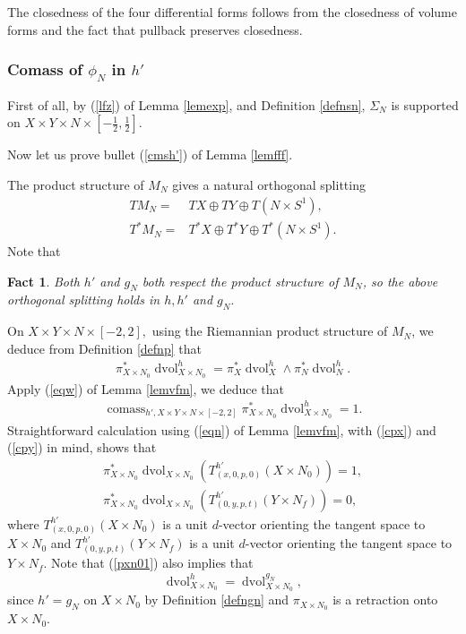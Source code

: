 \documentclass[11pt,a4paper]{amsart}
\numberwithin{equation}{section}
\newcommand{\Si}{\Sigma}
\newcommand{\cms}{\operatorname{comass}}
\newcommand{\dvol}{\operatorname{dvol}}
\newcommand{\du}{^\ast}
\newcommand{\pxn}{\pi_{X\times N_0}}
\newcommand{\dvx}{\dvol_{X\times N_0}^{g_N}}
\newcommand{\w}{\wedge}
\theoremstyle{plain}
\newtheorem{fact}[exam]{Fact}
\theoremstyle{definition}
\numberwithin{equation}{subsection}
\begin{document}
The closedness of the four differential forms follows from the closedness of volume forms and the fact that pullback preserves closedness.
\subsubsection{Comass of $\phi_N$ in $h'$}
First of all, by (\ref{lfz}) of Lemma \ref{lemexp}, and Definition \ref{defnsn},  $\Si_N$ is supported on $X\times Y\times N\times[-\frac{1}{2},\frac{1}{2}]$.

Now let us prove bullet (\ref{cmsh'}) of Lemma \ref{lemfff}.

The product structure of $M_N$ gives a natural orthogonal splitting 
\begin{align}
	\label{tms}TM_N=&TX\oplus TY\oplus T(N\times S^1),\\
		\label{tmds}T\du M_N=&T\du X\oplus T\du Y\oplus T\du (N\times S^1).
\end{align} Note that
\begin{fact}
Both	 $h'$ and $g_N$ both respect the product structure of $M_N$, so the above orthogonal splitting holds in $h,h'$ and $g_N.$
\end{fact}

 On $X\times Y\times N\times[-2,2],$ using the Riemannian product structure of $M_N$, we deduce from Definition \ref{defnp} that
\begin{align}\label{pxn0}
	\pxn\du\dvol_{X\times N_0}^h=\pi_X\du\dvol_X^h\w \pi_N\du\dvol_{N}^h.
\end{align}
Apply (\ref{eqw}) of Lemma \ref{lemvfm}, we deduce that
\begin{align}\label{cmsx}
\cms_{h',X\times Y\times N\times[-2,2]}	\pxn\du\dvol_{X\times N_0}^h=1.
\end{align}
 Straightforward calculation using (\ref{eqn})  of Lemma \ref{lemvfm}, with (\ref{cpx}) and (\ref{cpy}) in mind, shows that \begin{align}
\label{pxn01}	\pxn\du\dvol_{X\times N_0}(T^{h'}_{(x,0,p,0)}(X\times N_0))=1,\\
\label{pxn00}	\pxn\du\dvol_{X\times N_0}(T^{h'}_{(0,y,p,t)}(Y\times N_f))=0,
\end{align} 
where $T^{h'}_{(x,0,p,0)}(X\times N_0)$ is a unit $d$-vector orienting the tangent space to $X\times N_0$ and $T^{h'}_{(0,y,p,t)}(Y\times N_f)$ is a unit $d$-vector orienting the tangent space to $Y\times N_f.$ Note that (\ref{pxn01}) also implies that $$\dvol^h_{X\times N_0}=\dvx,$$ since $h'=g_N$ on $X\times N_0$ by Definition \ref{defngn} and $\pxn$ is a retraction onto $X\times N_0.$
\end{document}
